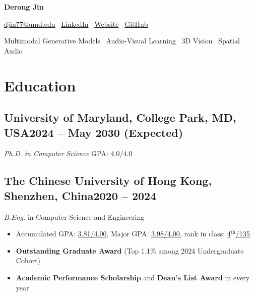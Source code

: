 \documentclass[11pt]{article}
\newcommand{\name}[1]{}
\newcommand{\basicInfo}[1]{}
\newcommand{\datedsubsection}[2]{}
\newcommand{\email}[1]{\href{mailto:#1}{#1}}
\newcommand{\linkedin}[2][]{\href{#2}{#1}}
\newcommand{\homepage}[2][]{\href{#2}{#1}}
\newcommand{\github}[2][]{\href{#2}{#1}}
\renewcommand{\name}[1]{{\centering\fontsize{24}{27}\selectfont\bfseries #1\par}\vspace{4pt}}
\renewcommand{\basicInfo}[1]{{\centering\fontsize{10.5}{12.5}\selectfont #1\par}\vspace{5pt}}
\renewcommand{\datedsubsection}[2]{%
  \subsection[#1]{#1\hfill{\normalfont\small #2}}}
\begin{document}
\fontsize{10.95}{13.2}\selectfont
\justifying
\setlength{\parindent}{0pt}
\name{Derong Jin}
\basicInfo{
  \email{djin77@umd.edu} \textperiodcentered\
  \linkedin[LinkedIn]{https://www.linkedin.com/in/derong-jin-663561256/} \textperiodcentered\
  \homepage[Website]{https://humathe.github.io/} \textperiodcentered\
  \github[GitHub]{https://github.com/HuMathe}
}
{\centering\fontsize{10}{12}\selectfont
Multimodal Generative Models \textperiodcentered\ Audio-Visual Learning \textperiodcentered\ 3D Vision \textperiodcentered\ Spatial Audio\par}

\section{Education}
\datedsubsection{\textbf{University of Maryland, College Park}, MD, USA}{2024 -- May 2030 (Expected)}
\textit{Ph.D. in Computer Science} \hfill GPA: 4.0/4.0
\datedsubsection{\textbf{The Chinese University of Hong Kong, Shenzhen}, China}{2020 -- 2024}
\textit{B.Eng.} in Computer Science and Engineering
\begin{itemize}
\item Accumulated GPA: \underline{3.81/4.00}, Major GPA: \underline{3.98/4.00}, rank in class: \underline{4$^\text{th}$/135}
\item \textbf{Outstanding Graduate Award} (Top 1.1\% among 2024 Undergraduate Cohort)
\item \textbf{Academic Performance Scholarship} and \textbf{Dean's List Award} in every year
\end{itemize}
\end{document}
